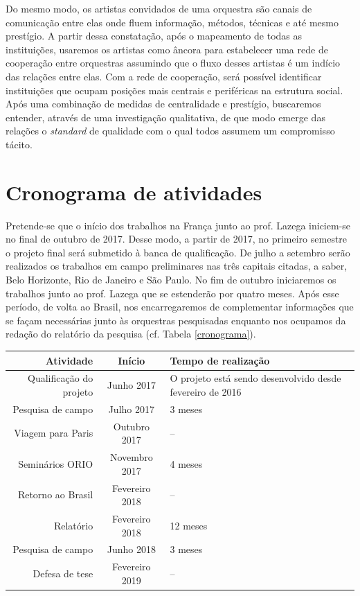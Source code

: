 \documentclass[a4paper, 12pt, openright, oneside, german, french, english, brazil, article]{abntex2}
\begin{document}
Do mesmo modo, os artistas convidados de uma orquestra são canais de comunicação entre elas onde fluem informação, métodos, técnicas e até mesmo prestígio. A partir dessa constatação, após o mapeamento de todas as instituições, usaremos os artistas como âncora para estabelecer uma rede de cooperação entre orquestras assumindo que o fluxo desses artistas é um indício das relações entre elas. Com a rede de cooperação, será possível identificar instituições que ocupam posições mais centrais e periféricas na estrutura social. Após uma combinação de medidas de centralidade e prestígio, buscaremos entender, através de uma investigação qualitativa, de que modo emerge das relações o \textit{standard} de qualidade com o qual todos assumem um compromisso tácito. 





\section{Cronograma de atividades}

Pretende-se que o início dos trabalhos na França junto ao prof. Lazega iniciem-se no final de outubro de 2017. Desse modo, a partir de 2017, no primeiro semestre o projeto final será submetido à banca de qualificação. De julho a setembro serão realizados os trabalhos em campo preliminares nas três capitais citadas, a saber, Belo Horizonte, Rio de Janeiro e São Paulo. No fim de outubro iniciaremos os trabalhos junto ao prof. Lazega que se estenderão por quatro meses. Após esse período, de volta ao Brasil, nos encarregaremos de complementar informações que se façam necessárias junto às orquestras pesquisadas enquanto nos ocupamos da redação do relatório da pesquisa (cf. Tabela \ref{cronograma}).

\begin{table}[!h]
{\begin{tabular}{rcp{5cm}}
	\hline
	\textbf{Atividade} & \textbf{Início} & \textbf{Tempo de realização} \\
	\hline
	Qualificação do projeto & Junho 2017 & O projeto está sendo desenvolvido desde fevereiro de 2016 \\
	\hline
	Pesquisa de campo & Julho 2017 & 3 meses \\
	\hline
	Viagem para Paris & Outubro 2017 & -- \\
	\hline
	Seminários ORIO & Novembro 2017 & 4 meses \\
	\hline
	Retorno ao Brasil & Fevereiro 2018 & -- \\
	\hline
	Relatório & Fevereiro 2018 & 12 meses \\
	\hline
	Pesquisa de campo & Junho 2018 & 3 meses \\
	\hline
	Defesa de tese & Fevereiro 2019 & -- \\
	\hline	
\end{tabular}
}
{}
\end{table}
\end{document}
